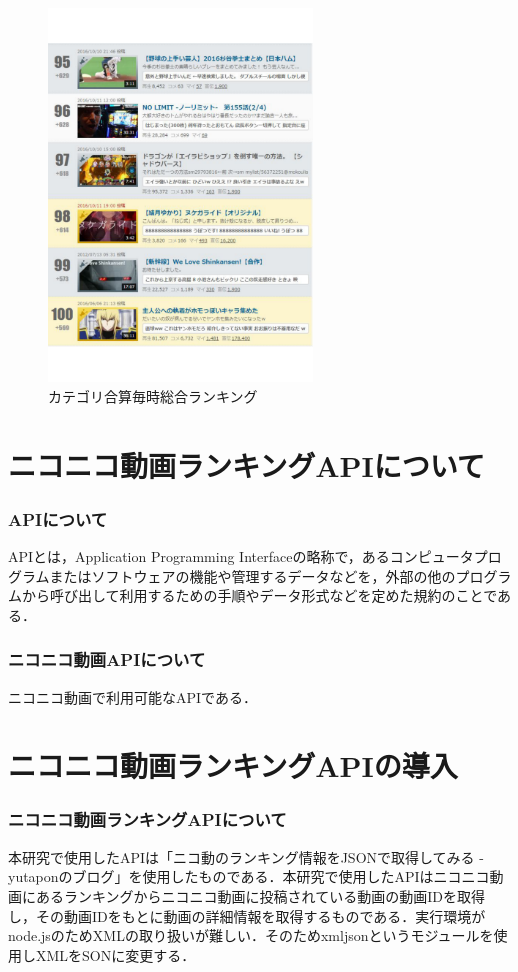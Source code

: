 \begin{figure}[htb]
\centering
\includegraphics[width=7cm]{r17.pdf}
\caption{カテゴリ合算毎時総合ランキング}\label{ace}
\end{figure}

\clearpage


\section{ニコニコ動画ランキングAPIについて}
\subsubsection{APIについて}
APIとは，Application Programming Interfaceの略称で，あるコンピュータプログラムまたはソフトウェアの機能や管理するデータなどを，外部の他のプログラムから呼び出して利用するための手順やデータ形式などを定めた規約のことである．

\subsubsection{ニコニコ動画APIについて}
ニコニコ動画で利用可能なAPIである．


\section{ニコニコ動画ランキングAPIの導入}

\subsubsection{ニコニコ動画ランキングAPIについて}
本研究で使用したAPIは「ニコ動のランキング情報をJSONで取得してみる - yutaponのブログ」\cite{nikoapi}を使用したものである．本研究で使用したAPIはニコニコ動画にあるランキングからニコニコ動画に投稿されている動画の動画IDを取得し，その動画IDをもとに動画の詳細情報を取得するものである．実行環境がnode.jsのためXMLの取り扱いが難しい．そのためxmljsonというモジュールを使用しXMLをSONに変更する．

